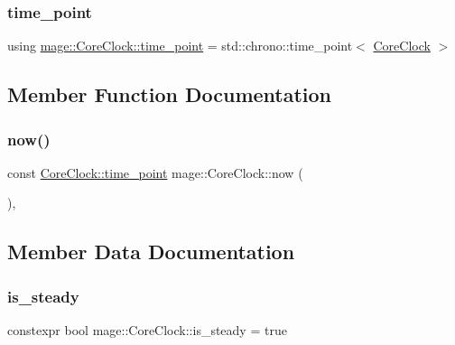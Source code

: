 \subsubsection{\texorpdfstring{time\+\_\+point}{time\_point}}
{\footnotesize\ttfamily using \mbox{\hyperlink{structmage_1_1_core_clock_a1ea0193dea9647827d27469ec9e3b61c}{mage\+::\+Core\+Clock\+::time\+\_\+point}} =  std\+::chrono\+::time\+\_\+point$<$ \mbox{\hyperlink{structmage_1_1_core_clock}{Core\+Clock}} $>$}



\subsection{Member Function Documentation}
\mbox{\label{structmage_1_1_core_clock_af363ca628c94c9229342b919f9541f7b}} 
\subsubsection{\texorpdfstring{now()}{now()}}
{\footnotesize\ttfamily const \mbox{\hyperlink{structmage_1_1_core_clock_a1ea0193dea9647827d27469ec9e3b61c}{Core\+Clock\+::time\+\_\+point}} mage\+::\+Core\+Clock\+::now (\begin{DoxyParamCaption}{ }\end{DoxyParamCaption})\hspace{0.3cm}{\ttfamily [static]}, {\ttfamily [noexcept]}}



\subsection{Member Data Documentation}
\mbox{\label{structmage_1_1_core_clock_ae6481fa7adddf1e9fefd45fba2e20516}} 
\subsubsection{\texorpdfstring{is\+\_\+steady}{is\_steady}}
{\footnotesize\ttfamily constexpr bool mage\+::\+Core\+Clock\+::is\+\_\+steady = true\hspace{0.3cm}{\ttfamily [static]}}


